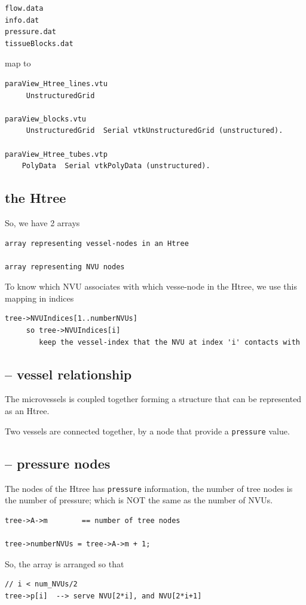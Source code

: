 \begin{verbatim}
flow.data
info.dat
pressure.dat
tissueBlocks.dat
\end{verbatim}

map to 
\begin{verbatim}
paraView_Htree_lines.vtu
     UnstructuredGrid 
     
paraView_blocks.vtu
     UnstructuredGrid  Serial vtkUnstructuredGrid (unstructured).

paraView_Htree_tubes.vtp
    PolyData  Serial vtkPolyData (unstructured).
\end{verbatim}

\subsection{the Htree}

So, we have 2 arrays
\begin{verbatim}
array representing vessel-nodes in an Htree 

array representing NVU nodes
\end{verbatim}

To know which NVU associates with which vesse-node in the Htree, we use this
mapping in indices
\begin{verbatim}
tree->NVUIndices[1..numberNVUs]  
     so tree->NVUIndices[i]
        keep the vessel-index that the NVU at index 'i' contacts with 
\end{verbatim}

\subsection{-- vessel relationship}

The microvessels is coupled together forming a structure that can be
represented as an Htree.

Two vessels are connected together, by a node that provide a \verb!pressure!
value. 

\subsection{-- pressure nodes}

The nodes of the Htree has \verb!pressure! information, the number of tree nodes
is the number of pressure; which is NOT the same as the number of NVUs.
\begin{verbatim}
tree->A->m        == number of tree nodes

tree->numberNVUs = tree->A->m + 1; 
\end{verbatim}
So, the array is arranged so that 
\begin{verbatim}
// i < num_NVUs/2
tree->p[i]  --> serve NVU[2*i], and NVU[2*i+1]
\end{verbatim}


